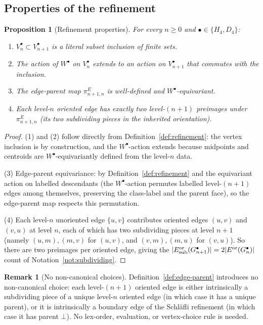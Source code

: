 \documentclass[11pt, a4paper]{amsart}
\newtheorem{proposition}[theorem]{Proposition}
\theoremstyle{definition}
\newtheorem{remark}[theorem]{Remark}
\begin{document}
\subsection{Properties of the refinement}

\begin{proposition}[Refinement properties]
\label{prop:refinement-equivariant}
For every $n \geq 0$ and $\bullet \in \{H_4, D_4\}$:
\begin{enumerate}
\item $V_n^\bullet \subset V_{n+1}^\bullet$ is a literal subset
  inclusion of finite sets.
\item The action of $W^\bullet$ on $V_n^\bullet$ extends to an
  action on $V_{n+1}^\bullet$ that commutes with the inclusion.
\item The edge-parent map $\pi_{n+1, n}^E$ is well-defined and
  $W^\bullet$-equivariant.
\item Each level-$n$ oriented edge has exactly two level-$(n+1)$
  preimages under $\pi_{n+1, n}^E$ (its two subdividing pieces in
  the inherited orientation).
\end{enumerate}
\end{proposition}

\begin{proof}
(1) and (2) follow directly from Definition~\ref{def:refinement}:
the vertex inclusion is by construction, and the
$W^\bullet$-action extends because midpoints and centroids are
$W^\bullet$-equivariantly defined from the level-$n$ data.

(3) Edge-parent equivariance: by Definition~\ref{def:refinement}
and the equivariant action on labelled descendants (the
$W^\bullet$-action permutes labelled level-$(n+1)$ edges among
themselves, preserving the class-label and the parent face), so
the edge-parent map respects this permutation.

(4) Each level-$n$ unoriented edge $\{u, v\}$ contributes
oriented edges $(u, v)$ and $(v, u)$ at level $n$, each of which
has two subdividing pieces at level $n+1$ (namely $(u, m), (m, v)$
for $(u, v)$, and $(v, m), (m, u)$ for $(v, u)$). So there are
two preimages per oriented edge, giving the $|E^{\rm or}_{\rm sub}
(G_{n+1}^\bullet)| = 2 |E^{\rm or}(G_n^\bullet)|$ count of
Notation~\ref{not:subdividing}.
\end{proof}

\begin{remark}[No non-canonical choices]
\label{rmk:no-canonical-choice}
Definition~\ref{def:edge-parent} introduces no non-canonical
choice: each level-$(n+1)$ oriented edge is either intrinsically a
subdividing piece of a unique level-$n$ oriented edge (in which
case it has a unique parent), or it is intrinsically a boundary
edge of the Schl\"{a}fli refinement (in which case it has parent
$\bot$). No lex-order, evaluation, or vertex-choice rule is needed.
\end{remark}
\end{document}
